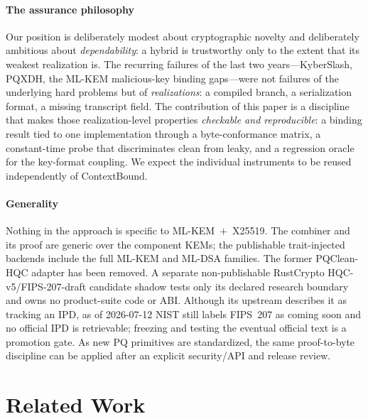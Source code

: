 \documentclass[journal]{IEEEtran}
\begin{document}
\paragraph*{The assurance philosophy}
Our position is deliberately modest about cryptographic novelty and deliberately ambitious about
\emph{dependability}: a hybrid is trustworthy only to the extent that its weakest realization is. The
recurring failures of the last two years---KyberSlash, PQXDH, the ML-KEM malicious-key binding
gaps---were not failures of the underlying hard problems but of \emph{realizations}: a compiled
branch, a serialization format, a missing transcript field. The contribution of this paper is a
discipline that makes those realization-level properties \emph{checkable and reproducible}: a binding
result tied to one implementation through a byte-conformance matrix, a constant-time probe that
discriminates clean from leaky, and a regression oracle for the key-format coupling. We expect the
individual instruments to be reused independently of ContextBound.

\paragraph*{Generality}
Nothing in the approach is specific to ML-KEM~$+$~X25519. The combiner and its proof are generic over
the component KEMs; the publishable trait-injected backends include the full ML-KEM and ML-DSA
families. The former PQClean-HQC adapter has been removed. A separate non-publishable RustCrypto
HQC-v5/FIPS-207-draft candidate shadow tests only its declared research boundary and owns no
product-suite code or ABI. Although its upstream describes it as tracking an IPD, as of
2026-07-12 NIST still labels FIPS~207 as coming soon and no official IPD is retrievable; freezing
and testing the eventual official text is a promotion gate. As new PQ primitives are standardized, the same proof-to-byte discipline
can be applied after an explicit security/API and release review.

\section{Related Work}\label{sec:related}
\end{document}
